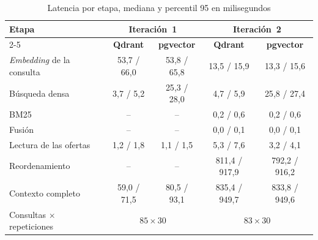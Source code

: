 \begin{table}[htbp!]
    \centering
    \caption{Latencia por etapa, mediana y percentil 95 en milisegundos}
    \label{tab:res-pe3-local}
    \small
    \begin{tabular}{|l|c|c|c|c|}
        \hline
        \multirow{2}{*}{\textbf{Etapa}} & \multicolumn{2}{c|}{\textbf{Iteración~1}} & \multicolumn{2}{c|}{\textbf{Iteración~2}} \\
        \cline{2-5}
         & \textbf{Qdrant} & \textbf{pgvector} & \textbf{Qdrant} & \textbf{pgvector} \\
        \hline
        \textit{Embedding} de la consulta & 53{,}7 / 66{,}0 & 53{,}8 / 65{,}8 & 13{,}5 / 15{,}9 & 13{,}3 / 15{,}6 \\
        \hline
        Búsqueda densa & 3{,}7 / 5{,}2 & 25{,}3 / 28{,}0 & 4{,}7 / 5{,}9 & 25{,}8 / 27{,}4 \\
        \hline
        BM25 & -- & -- & 0{,}2 / 0{,}6 & 0{,}2 / 0{,}6 \\
        \hline
        Fusión & -- & -- & 0{,}0 / 0{,}1 & 0{,}0 / 0{,}1 \\
        \hline
        Lectura de las ofertas & 1{,}2 / 1{,}8 & 1{,}1 / 1{,}5 & 5{,}3 / 7{,}6 & 3{,}2 / 4{,}1 \\
        \hline
        Reordenamiento & -- & -- & 811{,}4 / 917{,}9 & 792{,}2 / 916{,}2 \\
        \hline
        Contexto completo & 59{,}0 / 71{,}5 & 80{,}5 / 93{,}1 & 835{,}4 / 949{,}7 & 833{,}8 / 949{,}6 \\
        \hline
        Consultas $\times$ repeticiones & \multicolumn{2}{c|}{$85 \times 30$} & \multicolumn{2}{c|}{$83 \times 30$} \\
        \hline
    \end{tabular}
\end{table}

